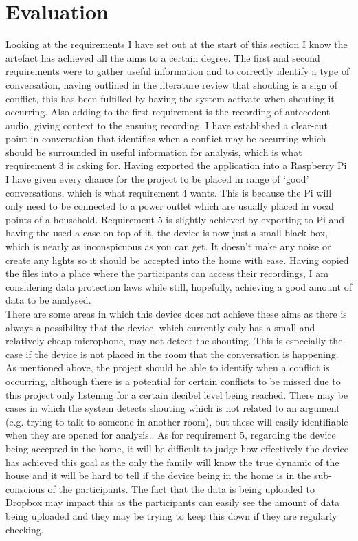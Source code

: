\documentclass[a4paper,11pt]{report}
\begin{document}
\section{Evaluation}
Looking at the requirements I have set out at the start of this section I know the artefact has achieved all the aims to a certain degree. The first and second requirements were to gather useful information and to correctly identify a type of conversation, having outlined in the literature review that shouting is a sign of conflict, this has been fulfilled by having the system activate when shouting it occurring. Also adding to the first requirement is the recording of antecedent audio, giving context to the ensuing recording. I have established a clear-cut point in conversation that identifies when a conflict may be occurring which should be surrounded in useful information for analysis, which is what requirement 3 is asking for. Having exported the application into a Raspberry Pi I have given every chance for the project to be placed in range of ‘good’ conversations, which is what requirement 4 wants. This is because the Pi will only need to be connected to a power outlet which are usually placed in vocal points of a household. Requirement 5 is slightly achieved by exporting to Pi and having the used a case on top of it, the device is now just a small black box, which is nearly as inconspicuous as you can get. It doesn’t make any noise or create any lights so it should be accepted into the home with ease. Having copied the files into a place where the participants can access their recordings, I am considering data protection laws while still, hopefully, achieving a good amount of data to be analysed.\\

There are some areas in which this device does not achieve these aims as there is always a possibility that the device, which currently only has a small and relatively cheap microphone, may not detect the shouting. This is especially the case if the device is not placed in the room that the conversation is happening. As mentioned above, the project should be able to identify when a conflict is occurring, although there is a potential for certain conflicts to be missed due to this project only listening for a certain decibel level being reached. There may be cases in which the system detects shouting which is not related to an argument (e.g. trying to talk to someone in another room), but these will easily identifiable when they are opened for analysis.. As for requirement 5, regarding the device being accepted in the home, it will be difficult to judge how effectively the device has achieved this goal as the only the family will know the true dynamic of the house and it will be hard to tell if the device being in the home is in the sub-conscious of the participants. The fact that the data is being uploaded to Dropbox may impact this as the participants can easily see the amount of data being uploaded and they may be trying to keep this down if they are regularly checking. 
\end{document}
